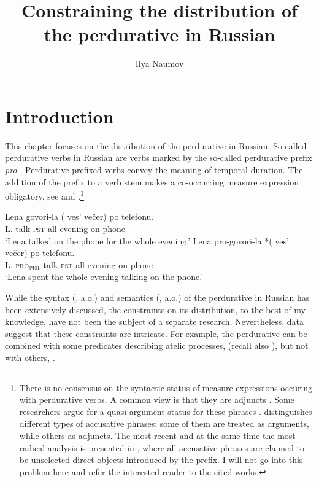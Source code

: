 \documentclass[output=paper,
]{langscibook}
\author{Ilya Naumov\affiliation{National Research University Higher School of Economics}}
\title{Constraining the distribution of the perdurative in Russian}
\begin{document}
%
\maketitle

\section{Introduction} \label{sec:naumov:1}
This chapter focuses on the distribution of the perdurative in Russian. So-called perdurative verbs in Russian are verbs marked by the so-called perdurative prefix \textit{pro-}. Perdurative-prefixed verbs convey the meaning of temporal duration. The addition of the prefix to a verb stem makes a co-occurring measure expression obligatory, see  and .\footnote{There is no consensus on the syntactic status of measure expressions occuring with perdurative verbs. A common view is that they are adjuncts \citep[a.o.]{borik2006aspect,ramchand2008verb,gehrke2008ps}. Some researchers argue for a quasi-argument status for these phrases \citep{fowler1993argument}. \citet{schoorlemmer1995participial} distinguishes different types of accusative phrases: some of them are treated as arguments, while others as adjuncts. The most recent and at the same time the most radical analysis is presented in \citet{Žaucer2009vp,Žaucer2012syntax}, where all accusative phrases are claimed to be unselected direct objects introduced by the prefix. I will not go into this problem here and refer the interested reader to the cited works.}

\ea \ea \label{ex:naumov:1}
\gll Lena	govori-la	(\hspace{-2pt} ves’	večer)		po	telefonu.\\  
     L.	talk-\textsc{pst} {} all	evening	on	phone\\ 
\glt `Lena talked on the phone for the whole evening.'
\ex\gll Lena pro-govori-la *(\hspace{-2pt} ves' večer)		po telefonu.\\  
     L. \textsc{pro}$_{\textsc{per}}$-talk-\textsc{pst} {} all	evening	on	phone\\ 
\glt `Lena spent the whole evening talking on the phone.'\label{ex:naumov:1b}
\z \z

\noindent While the syntax (\citealt{babko1999zero,ramchand2005time,svenonius2004slavic,romanova2007constructing,gehrke2008ps,Žaucer2009vp,tolskaya2015verbal}, a.o.) and semantics (\citealt{isacenko1960grammaticeskij,bondarko1967,forsyth1970grammar,flier1985scope,zalizniak2000,gehrke2003aspectual,filip2005measures}, a.o.) of the perdurative in Russian has been extensively discussed, the constraints on its distribution, to the best of my knowledge, have not been the subject of a separate research. Nevertheless, data suggest that these constraints are intricate. For example, the perdurative can be combined with some predicates describing atelic processes,  (recall also ), but not with others, .
\end{document}
